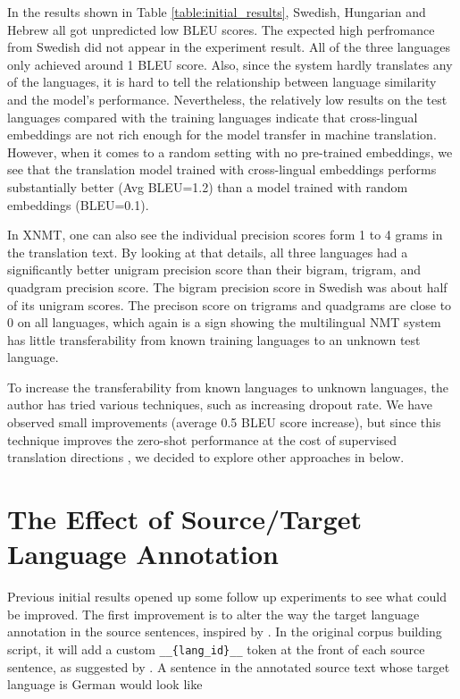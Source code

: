 \documentclass[thesis,fonts=libertine]{cluu}
\begin{document}
In the results shown in Table \ref{table:initial_results}, Swedish, Hungarian and Hebrew all got unpredicted low BLEU scores. The expected high perfromance from Swedish did not appear in the experiment result. All of the three languages only achieved around 1 BLEU score. Also, since the system hardly translates any of the languages, it is hard to tell the relationship between language similarity and the model's performance. Nevertheless, the relatively low results on the test languages compared with the training languages indicate that cross-lingual embeddings are not rich enough for the model transfer in machine translation. However, when it comes to a random setting with no pre-trained embeddings, we see that the translation model trained with cross-lingual embeddings performs substantially better (Avg BLEU=1.2) than a model trained with random embeddings (BLEU=0.1).

In XNMT, one can also see the individual precision scores form 1 to 4 grams in the translation text. By looking at that details, all three languages had a significantly better unigram precision score than their bigram, trigram, and quadgram precision score. The bigram precision score in Swedish was about half of its unigram scores. The precison score on trigrams and quadgrams are close to 0 on all languages, which again is a sign showing the multilingual NMT system has little transferability from known training languages to an unknown test language.

To increase the transferability from known languages to unknown languages, the author has tried various techniques, such as increasing dropout rate. We have observed small improvements (average 0.5 BLEU score increase), but since this technique improves the zero-shot performance at the cost of supervised translation directions \cite{Arivazhagan:2019aa}, we decided to explore other approaches in below.

\section{The Effect of Source/Target Language Annotation}

Previous initial results opened up some follow up experiments to see what could be improved. The first improvement is to alter the way the target language annotation in the source sentences, inspired by \cite{Blackwood:2018aa}. In the original corpus building script, it will add a custom \verb|__{lang_id}__| token at the front of each source sentence, as suggested by \cite{Johnson:2016aa}. A sentence in the annotated source text whose target language is German would look like 
\end{document}

